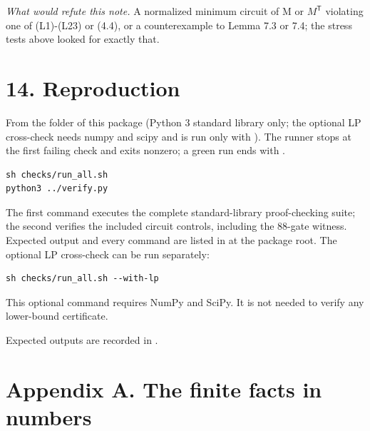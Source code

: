 \emph{What would refute this note.} A normalized minimum circuit of M or \(M^{\mathsf T}\) violating one of (L1)-(L23) or (4.4), or a counterexample to Lemma 7.3 or 7.4; the stress tests above looked for exactly that.

\hypertarget{reproduction}{%
\section{14. Reproduction}\label{reproduction}}

From the folder \texttt{} of this package (Python 3 standard library only; the optional LP cross-check \texttt{} needs numpy and scipy and is run only with \texttt{}). The runner stops at the first failing check and exits nonzero; a green run ends with \texttt{}.

\begin{verbatim}
sh checks/run_all.sh
python3 ../verify.py
\end{verbatim}

The first command executes the complete standard-library proof-checking suite; the second verifies the included circuit controls, including the 88-gate witness. Expected output and every command are listed in \texttt{} at the package root. The optional LP cross-check can be run separately:

\begin{verbatim}
sh checks/run_all.sh --with-lp
\end{verbatim}

This optional command requires NumPy and SciPy. It is not needed to verify any lower-bound certificate.

Expected outputs are recorded in \texttt{}.

\hypertarget{appendix-a.-the-finite-facts-in-numbers}{%
\section{Appendix A. The finite facts in numbers}\label{appendix-a.-the-finite-facts-in-numbers}}

